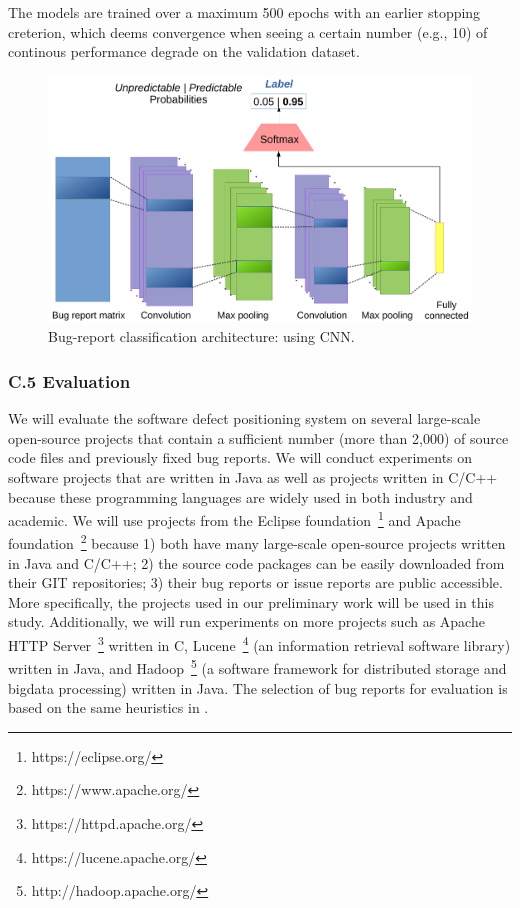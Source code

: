The models are trained over a maximum 500 epochs with an earlier stopping creterion, which deems convergence when seeing a certain number (e.g., 10) of continous performance degrade on the validation dataset.

\begin{figure}[t]
\centering
\includegraphics[width=\columnwidth]{figures/cnn.pdf}
\caption{Bug-report classification architecture: using CNN.}
\label{fig:cnn}
\end{figure}

\subsubsection{C.5 Evaluation}
We will evaluate the software defect positioning system on several large-scale open-source projects that contain a sufficient number (more than 2,000) of source code files and previously fixed bug reports. We will conduct experiments on software projects that are written in Java as well as projects written in C/C++ because these programming languages are widely used in both industry and academic. We will use projects from the Eclipse foundation~\footnote{https://eclipse.org/} and Apache foundation~\footnote{https://www.apache.org/} because 1) both have many large-scale open-source projects written in Java and C/C++; 2) the source code packages can be easily downloaded from their GIT repositories; 3) their bug reports or issue reports are public accessible. More specifically, the projects used in our preliminary work \cite{Ye:TSE15} will be used in this study. Additionally, we will run experiments on more projects such as Apache HTTP Server~\footnote{https://httpd.apache.org/} written in C, Lucene~\footnote{https://lucene.apache.org/} (an information retrieval software library) written in Java, and Hadoop~\footnote{http://hadoop.apache.org/} (a software framework for distributed storage and bigdata processing) written in Java. The selection of bug reports for evaluation is based on the same heuristics in \cite{Dallmeier:2007:EBL:1321631.1321702,Ye:FSE14}.


